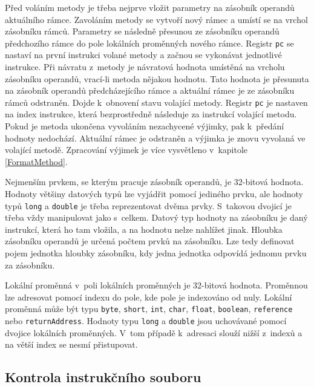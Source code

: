 Před voláním metody je třeba nejprve vložit parametry na zásobník operandů aktuálního rámce. Zavoláním metody se vytvoří nový rámec a umístí se na vrchol zásobníku rámců. Parametry se následně přesunou ze zásobníku operandů předchozího rámce do pole lokálních proměnných nového rámce. Registr \texttt{pc} se nastaví na první instrukci volané metody a začnou se vykonávat jednotlivé instrukce. Při návratu z~metody je návratová hodnota umístěná na vrcholu zásobníku operandů, vrací-li metoda nějakou hodnotu. Tato hodnota je přesunuta na zásobník operandů předcházejícího rámce a aktuální rámec je ze zásobníku rámců odstraněn. Dojde k~obnovení stavu volající metody. Registr \texttt{pc} je nastaven na index instrukce, která bezprostředně následuje za instrukcí volající metodu. Pokud je metoda ukončena vyvoláním nezachycené výjimky, pak k~předání hodnoty nedochází. Aktuální rámec je odstraněn a výjimka je znovu vyvolaná ve volající metodě. Zpracování výjimek je více vysvětleno v~kapitole \ref{FormatMethod}.

Nejmenším prvkem, se kterým pracuje zásobník operandů, je 32-bitová hodnota. Hodnoty většiny datových typů lze vyjádřit pomocí jediného prvku, ale hodnoty typů \texttt{long} a \texttt{double} je třeba reprezentovat dvěma prvky. S~takovou dvojicí je třeba vždy manipulovat jako s~celkem. Datový typ hodnoty na zásobníku je daný instrukcí, která ho tam vložila, a na hodnotu nelze nahlížet jinak. Hloubka zásobníku operandů je určená počtem prvků na zásobníku. Lze tedy definovat pojem jednotka hloubky zásobníku, kdy jedna jednotka odpovídá jednomu prvku za zásobníku.

Lokální proměnná v~poli lokálních proměnných je 32-bitová hodnota. Proměnnou lze adresovat pomocí indexu do pole, kde pole je indexováno od nuly. Lokální proměnná může být typu \texttt{byte}, \texttt{short}, \texttt{int}, \texttt{char}, \texttt{float}, \texttt{boolean}, \texttt{reference} nebo \texttt{returnAddress}. Hodnoty typu \texttt{long} a \texttt{double} jsou uchovávané pomocí dvojice lokálních proměnných. V~tom případě k~adresaci slouží nižší z~indexů a na větší index se nesmí přistupovat. 


\subsection{Kontrola instrukčního souboru}\label{JVMVerification}

